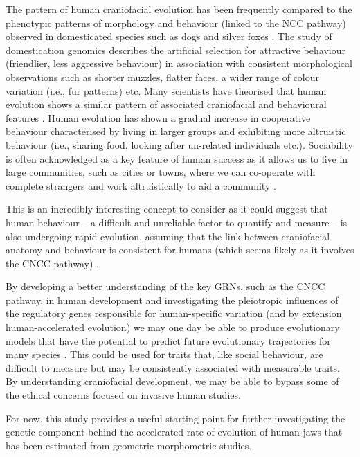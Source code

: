 \documentclass{article}[12pt]
\begin{document}
The pattern of human craniofacial evolution has been frequently compared to the phenotypic patterns of morphology and behaviour (linked to the \Gls{NCC} pathway) observed in domesticated species such as dogs and silver foxes \parencite{Kistner2021, Pendleton2018}. The study of domestication genomics describes the artificial selection for attractive behaviour (friendlier, less aggressive behaviour) in association with consistent morphological observations such as shorter muzzles, flatter faces, a wider range of colour variation (i.e., fur patterns) etc. Many scientists have theorised that human evolution shows a similar pattern of associated craniofacial and behavioural features \parencite{domesticatedhumans, domesticatedhumans2, Vallender2008}. Human evolution has shown a gradual increase in cooperative behaviour characterised by living in larger groups and exhibiting more altruistic behaviour (i.e., sharing food, looking after un-related individuals etc.). Sociability is often acknowledged as a key feature of human success as it allows us to live in large communities, such as cities or towns, where we can co-operate with complete strangers and work altruistically to aid a community \parencite{Cieri2014}.

This is an incredibly interesting concept to consider as it could suggest that human behaviour – a difficult and unreliable factor to quantify and measure – is also undergoing rapid evolution, assuming that the link between craniofacial anatomy and behaviour is consistent for humans (which seems likely as it involves the \Gls{CNCC} pathway) \parencite{domesticatedhumans2}. 

By developing a better understanding of the key \Glspl{GRN}, such as the \Gls{CNCC} pathway, in human development and investigating the pleiotropic influences of the regulatory genes responsible for human-specific variation (and by extension human-accelerated evolution) we may one day be able to produce evolutionary models that have the potential to predict future evolutionary trajectories for many species \parencite{Li2009, Osorio2015, PhyloP}. This could be used for traits that, like social behaviour, are difficult to measure but may be consistently associated with measurable traits. By understanding craniofacial development, we may be able to bypass some of the ethical concerns focused on invasive human studies.

For now, this study provides a useful starting point for further investigating the genetic component behind the accelerated rate of evolution of human jaws that has been estimated from geometric morphometric studies.
\end{document}
